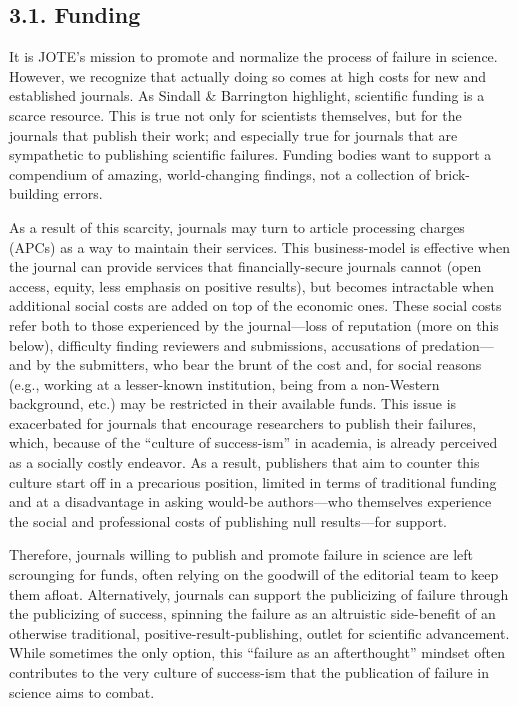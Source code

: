 \documentclass{article}
\begin{document}
\subsection{3.1. Funding}

It is JOTE's mission to promote and normalize the process of failure in science. However, we recognize that actually doing so comes at high costs for new and established journals. As Sindall \& Barrington highlight, scientific funding is a scarce resource. This is true not only for scientists themselves, but for the journals that publish their work; and especially true for journals that are sympathetic to publishing scientific failures. Funding bodies want to support a compendium of amazing, world-changing findings, not a collection of brick-building errors. 

As a result of this scarcity, journals may turn to article processing charges (APCs) as a way to maintain their services. This business-model is effective when the journal can provide services that financially-secure journals cannot (open access, equity, less emphasis on positive results), but becomes intractable when additional social costs are added on top of the economic ones. These social costs refer both to those experienced by the journal—loss of reputation (more on this below), difficulty finding reviewers and submissions, accusations of predation—and by the submitters, who bear the brunt of the cost and, for social reasons (e.g., working at a lesser-known institution, being from a non-Western background, etc.) may be restricted in their available funds. This issue is exacerbated for journals that encourage researchers to publish their failures, which, because of the “culture of success-ism” in academia, is already perceived as a socially costly endeavor. As a result, publishers that aim to counter this culture start off in a precarious position, limited in terms of traditional funding and at a disadvantage in asking would-be authors—who themselves experience the social and professional costs of publishing null results—for support. 

Therefore, journals willing to publish and promote failure in science are left scrounging for funds, often relying on the goodwill of the editorial team to keep them afloat. Alternatively, journals can support the publicizing of failure through the publicizing of success, spinning the failure as an altruistic side-benefit of an otherwise traditional, positive-result-publishing, outlet for scientific advancement. While sometimes the only option, this “failure as an afterthought” mindset often contributes to the very culture of success-ism that the publication of failure in science aims to combat. 
\end{document}
